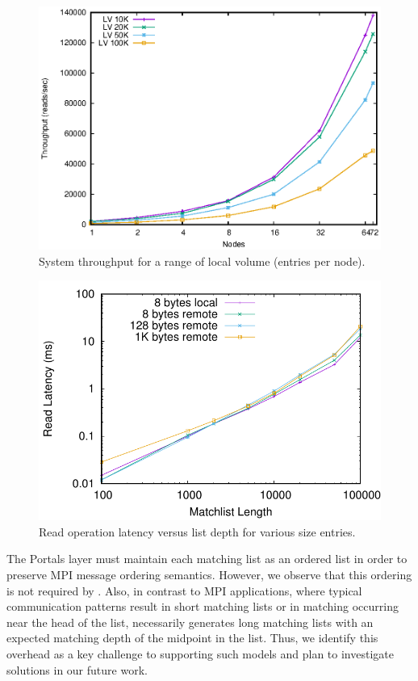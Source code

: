\begin{figure}
    \centering
    \includegraphics[width=\linewidth]{plots/throughput}
    \caption{System throughput for a range of local volume (entries per node).}
    \label{fig:throughput}
\end{figure}

\begin{figure}
    \centering
    \includegraphics[width=\linewidth]{plots/mlen}
    \caption{Read operation latency versus list depth for various size entries.}
    \label{fig:mlen}
\end{figure}

The Portals layer must maintain each matching list as an ordered list in order
to preserve MPI message ordering semantics.  However, we observe that this
ordering is not required by \pdht.  Also, in contrast to MPI applications,
where typical communication patterns result in short matching lists or in
matching occurring near the head of the list, \pdht necessarily generates long
matching lists with an expected matching depth of the midpoint in the list.
Thus, we identify this overhead as a key challenge to supporting such models
and plan to investigate solutions in our future work.

